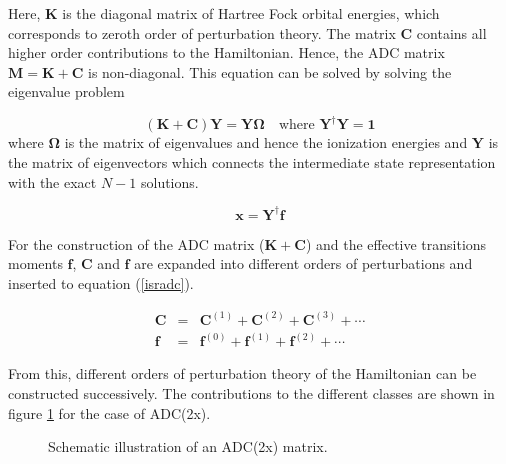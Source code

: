 Here, $\mathbf{K}$ is the diagonal matrix of Hartree Fock orbital energies, which
corresponds to zeroth order of perturbation theory. The matrix $\mathbf{C}$
contains all higher order contributions to the Hamiltonian.
Hence, the ADC matrix $\mathbf{M} = \mathbf{K}+\mathbf{C}$ is non-diagonal.
This equation can be solved by
solving the eigenvalue problem

\begin{equation}\label{adcewp}
(\mathbf{K}+\mathbf{C}) \mathbf{Y} = \mathbf{Y}\mathbf{\Omega} \quad\text{where } \mathbf{Y}^\dagger\mathbf{Y}=\mathbf{1}
\end{equation}
where $\mathbf{\Omega}$ is the matrix of eigenvalues and hence the ionization
energies and $\mathbf{Y}$ is the matrix of eigenvectors which connects the
intermediate state representation with the exact $N-1$ solutions.

\begin{equation}
 \mathbf{x} = \mathbf{Y}^\dagger \mathbf{f}
\end{equation}

For the construction of the \ac{ADC} matrix ($\mathbf{K}+\mathbf{C}$) and the
effective transitions moments $\mathbf{f}$, $\mathbf{C}$ and $\mathbf{f}$
are expanded into different orders of perturbations and inserted to equation
(\ref{isradc}).

\begin{eqnarray}
\mathbf{C} &=& \mathbf{C}^{(1)} + \mathbf{C}^{(2)} + \mathbf{C}^{(3)} + \cdots\label{stC}\\
\mathbf{f} &=& \mathbf{f}^{(0)} + \mathbf{f}^{(1)} + \mathbf{f}^{(2)} + \cdots\label{stf}
\end{eqnarray}

From this, different orders of perturbation theory of the Hamiltonian can be
constructed successively. The contributions to the different classes are shown
in figure \ref{figure:adcmat_pgf} for the case of \ac{ADC}(2x).

\begin{figure}[h]
  \centering
  
  \caption{Schematic illustration of an \ac{ADC}(2x) matrix.}
  \label{figure:adcmat_pgf}
\end{figure}

